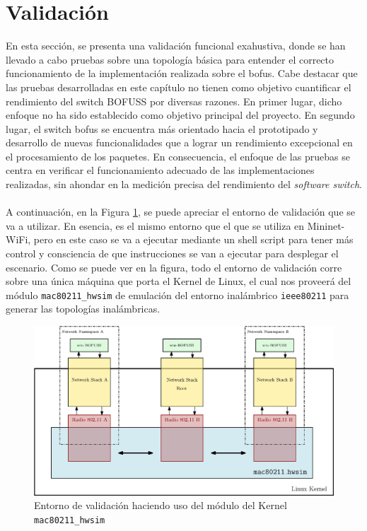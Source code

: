 \section{Validación}
\label{sec:vali}

En esta sección, se presenta una validación funcional exahustiva, donde se han llevado a cabo pruebas sobre una topología básica para entender el correcto funcionamiento de la implementación realizada sobre el \gls{bofus}. Cabe destacar que las pruebas desarrolladas en este capítulo no tienen como objetivo cuantificar el rendimiento del switch BOFUSS por diversas razones. En primer lugar, dicho enfoque no ha sido establecido como objetivo principal del proyecto. En segundo lugar, el switch \gls{bofus} se encuentra más orientado hacia el prototipado y desarrollo de nuevas funcionalidades que a lograr un rendimiento excepcional en el procesamiento de los paquetes. En consecuencia, el enfoque de las pruebas se centra en verificar el funcionamiento adecuado de las implementaciones realizadas, sin ahondar en la medición precisa del rendimiento del \textit{software switch}.\\
\\
A continuación, en la Figura \ref{fig:scenario_eva}, se puede apreciar el entorno de validación que se va a utilizar. En esencia, es el mismo entorno que el que se utiliza en Mininet-WiFi, pero en este caso se va a ejecutar mediante un shell script para tener más control y consciencia de que instrucciones se van a ejecutar para desplegar el escenario. Como se puede ver en la figura, todo el entorno de validación corre sobre una única máquina que porta el Kernel de Linux, el cual nos proveerá del módulo \texttt{mac80211\_hwsim} de emulación del entorno inalámbrico \texttt{ieee80211} para generar las topologías inalámbricas.\\

\begin{figure}[ht]
    \centering
    \includegraphics[width=\textwidth]{archivos/img/dev/scenario_eva.eps}
    \caption{Entorno de validación haciendo uso del módulo del Kernel \texttt{mac80211\_hwsim}}
    \label{fig:scenario_eva}
\end{figure}

